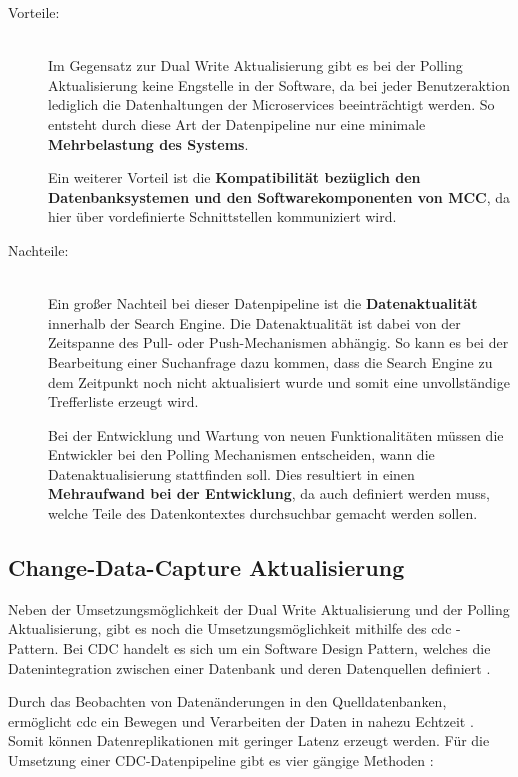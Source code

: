\begin{description}
    \item[Vorteile:]\hfill \\
    Im Gegensatz zur Dual Write Aktualisierung gibt es bei der Polling Aktualisierung keine Engstelle in der Software, da bei jeder Benutzeraktion lediglich die Datenhaltungen der Microservices beeinträchtigt werden. So entsteht durch diese Art der Datenpipeline nur eine minimale \textbf{Mehrbelastung des Systems}.

    Ein weiterer Vorteil ist die \textbf{Kompatibilität bezüglich den Datenbanksystemen und den Softwarekomponenten von MCC}, da hier über vordefinierte Schnittstellen kommuniziert wird.
    
    \item[Nachteile:]\hfill \\
    Ein großer Nachteil bei dieser Datenpipeline ist die \textbf{Datenaktualität} innerhalb der Search Engine. Die Datenaktualität ist dabei von der Zeitspanne des Pull- oder Push-Mechanismen abhängig. So kann es bei der Bearbeitung einer Suchanfrage dazu kommen, dass die Search Engine zu dem Zeitpunkt noch nicht aktualisiert wurde und somit eine unvollständige Trefferliste erzeugt wird.

    Bei der Entwicklung und Wartung von neuen Funktionalitäten müssen die Entwickler bei den Polling Mechanismen entscheiden, wann die Datenaktualisierung stattfinden soll. Dies resultiert in einen \textbf{Mehraufwand bei der Entwicklung}, da auch definiert werden muss, welche Teile des Datenkontextes \glqq durchsuchbar\grqq{} gemacht werden sollen.

\end{description}

\subsection{Change-Data-Capture Aktualisierung\label{subsec4.2.4:Unterunterpunkt-4}}

Neben der Umsetzungsmöglichkeit der Dual Write Aktualisierung und der Polling Aktualisierung, gibt es noch die Umsetzungsmöglichkeit mithilfe des \gls{cdc} - Pattern. Bei CDC handelt es sich um ein Software Design Pattern, welches die Datenintegration zwischen einer Datenbank und deren Datenquellen definiert \cite{Datenbankenverstehen.de.2021}.

Durch das Beobachten von Datenänderungen in den Quelldatenbanken, ermöglicht \gls{cdc} ein Bewegen und Verarbeiten der Daten in nahezu Echtzeit \cite{JohnKutay.2021}. Somit können Datenreplikationen mit geringer Latenz erzeugt werden. Für die Umsetzung einer CDC-Datenpipeline gibt es vier gängige Methoden \cite{MarkVandeWiel.2021}:

